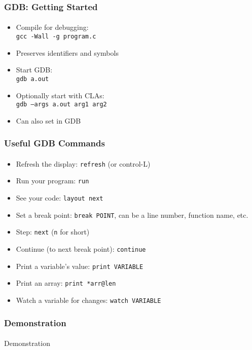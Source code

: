\documentclass[]{beamer}
\begin{document}
\begin{frame}[fragile]
    \frametitle{GDB: Getting Started}
    \framesubtitle{}

\begin{itemize}[<+->]
  \item Compile for debugging:\\
  \texttt{gcc -Wall -g program.c}
  \item Preserves identifiers and symbols
  \item Start GDB:\\
  \texttt{gdb a.out}
  \item Optionally start with CLAs: \\
  \texttt{gdb --args a.out arg1 arg2}
  \item Can also set in GDB
\end{itemize}

\end{frame}


\begin{frame}[fragile]
    \frametitle{Useful GDB Commands}
    \framesubtitle{}

\begin{itemize}
  \item Refresh the display: \texttt{refresh} (or control-L)
  \item Run your program: \texttt{run}
  \item See your code: \texttt{layout next}
  \item Set a break point: \texttt{break POINT}, can be a line number, function name, etc.
  \item Step: \texttt{next} (\texttt{n} for short)
  \item Continue (to next break point): \texttt{continue}
  \item Print a variable's value: \texttt{print VARIABLE}
  \item Print an array: \texttt{print *arr@len}
  \item Watch a variable for changes: \texttt{watch VARIABLE}
\end{itemize}  

\end{frame}


\begin{frame}[fragile]
    \frametitle{Demonstration}
    \framesubtitle{}

Demonstration    
    
\end{frame}
\end{document}
